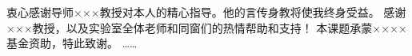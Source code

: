 \begin{acknowledgements}
衷心感谢导师×××教授对本人的精心指导。他的言传身教将使我终身受益。
感谢×××教授，以及实验室全体老师和同窗们的热情帮助和支持！
本课题承蒙××××基金资助，特此致谢。
……

\end{acknowledgements}
